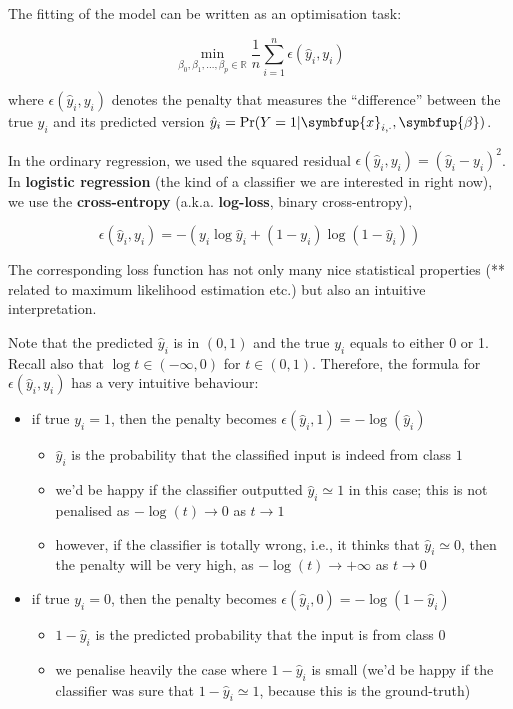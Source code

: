 \documentclass[10pt,b5paper,krantz1]{krantz}
\providecommand{\tightlist}{%
  \setlength{\itemsep}{0pt}\setlength{\parskip}{0pt}}
\renewcommand{\mathbf}[1]{\symbfup{#1}}
\renewcommand{\boldsymbol}[1]{\symbfup{#1}}
\begin{document}
The fitting of the model can be written as an optimisation task:

\[
\min_{\beta_0, \beta_1,\dots, \beta_p\in\mathbb{R}}
\frac{1}{n} \sum_{i=1}^n
\epsilon\left(\hat{y}_i, y_i \right)
\]

where \(\epsilon(\hat{y}_i, y_i)\) denotes the penalty that measures the
``difference'' between the true \(y_i\) and its predicted version
\(\hat{y}_i=\Pr(Y=1|\mathbf{x}_{i,\cdot},\boldsymbol\beta)\).

In the ordinary regression, we used the squared residual
\(\epsilon(\hat{y}_i, y_i) = (\hat{y}_i-y_i)^2\).
In \textbf{logistic regression} (the kind of a classifier we are
interested in right now), we use
the \textbf{cross-entropy} (a.k.a. \textbf{log-loss}, binary cross-entropy),

\[
\epsilon(\hat{y}_i,y_i) = - \left(y_i \log \hat{y}_i + (1-y_i) \log(1-\hat{y}_i)\right)
\]

The corresponding loss function has not only
many nice statistical properties (** related to maximum likelihood
estimation etc.)
but also an intuitive interpretation.

Note that the predicted \(\hat{y}_i\) is in \((0,1)\) and the true \(y_i\)
equals to either 0 or 1.
Recall also that \(\log t\in(-\infty, 0)\) for \(t\in (0,1)\).
Therefore, the formula for \(\epsilon(\hat{y}_i,y_i)\)
has a very intuitive behaviour:

\begin{itemize}
\item
  if true \(y_i=1\), then the penalty becomes \(\epsilon(\hat{y}_i, 1) = -\log(\hat{y}_i)\)

  \begin{itemize}
  \tightlist
  \item
    \(\hat{y}_i\) is the probability that the classified input is indeed from class \(1\)
  \item
    we'd be happy if the classifier outputted \(\hat{y}_i\simeq 1\) in this case;
    this is not penalised as \(-\log(t)\to 0\) as \(t\to 1\)
  \item
    however, if the classifier is totally wrong, i.e., it thinks that
    \(\hat{y}_i\simeq 0\), then the penalty will be very high, as \(-\log(t)\to+\infty\)
    as \(t\to 0\)
  \end{itemize}
\item
  if true \(y_i=0\), then the penalty becomes \(\epsilon(\hat{y}_i, 0) = -\log(1-\hat{y}_i)\)

  \begin{itemize}
  \tightlist
  \item
    \(1-\hat{y}_i\) is the predicted probability that the input is from class \(0\)
  \item
    we penalise heavily the case where \(1-\hat{y}_i\) is small (we'd be happy
    if the classifier was sure that \(1-\hat{y}_i\simeq 1\), because this is the ground-truth)
  \end{itemize}
\end{itemize}
\end{document}
